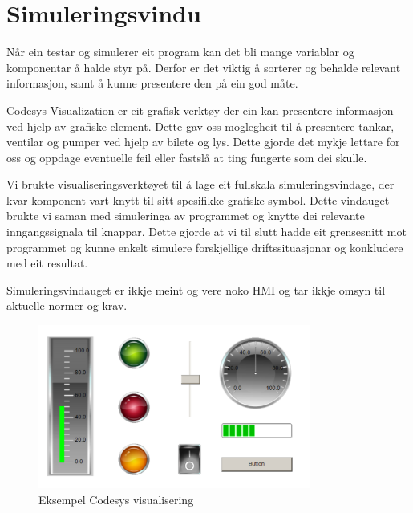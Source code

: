 \section{Simuleringsvindu}
\thispagestyle{fancy}

Når ein testar og simulerer eit program kan det bli mange variablar og komponentar
å halde styr på. Derfor er det viktig å sorterer og behalde relevant informasjon, 
samt å kunne presentere den på ein god måte.

\gls{Codesys} Visualization\citep{CodesysVizualisation} er eit grafisk verktøy der ein kan presentere informasjon
ved hjelp av grafiske element. Dette gav oss moglegheit til å presentere tankar, ventilar og pumper
ved hjelp av bilete og lys. 
Dette gjorde det mykje lettare for oss og oppdage eventuelle feil eller fastslå at ting fungerte som dei skulle.

Vi brukte visualiseringsverktøyet til å lage eit fullskala simuleringsvindage, der kvar komponent
vart knytt til sitt spesifikke grafiske symbol. Dette vindauget brukte vi saman med simuleringa
av programmet og knytte dei relevante inngangssignala til knappar. 
Dette gjorde at vi til slutt hadde eit grensesnitt mot programmet og kunne enkelt simulere
forskjellige driftssituasjonar og konkludere med eit resultat.

Simuleringsvindauget er ikkje meint og vere noko
\gls{HMI} og tar ikkje omsyn til aktuelle normer og krav.

\begin{figure}[htbp]
    \centering
    \includegraphics[width=0.8\textwidth]{Bilder/Codesys symbol.png}
    \caption{Eksempel \gls{Codesys} visualisering}\label{fig:CodesysVisualisering}
\end{figure}

\newpage

